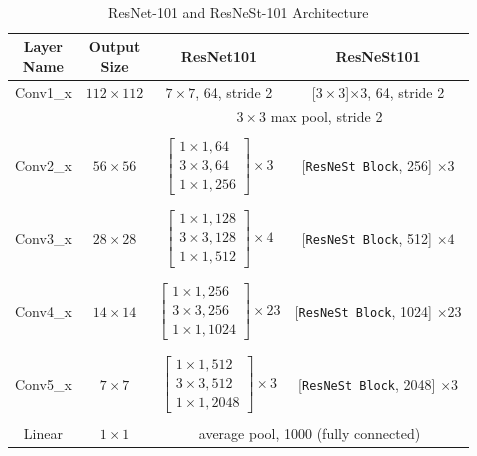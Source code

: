 \documentclass [MAS] {uclathes}
\begin{document}
\

\begin{table}[h!]
\centering
\footnotesize 
\renewcommand{\arraystretch}{0.7}
\begin{tabular}{ c | c | c | c } 
\hline
\makecell{\textbf{Layer} \\ \textbf{Name}} & \makecell{\textbf{Output} \\ \textbf{Size}} & \textbf{ResNet101} & \textbf{ResNeSt101}\\ 
\hline
\hline
Conv1\_x & $112 \times 112$ & $7 \times 7$, 64, stride 2 & [$3\times 3$]$\times 3$, 64, stride 2\\
\hline
 &  & \multicolumn{2}{c}{$3 \times 3$ max pool, stride 2}\\
\hline
&  & & \\
Conv2\_x & $56 \times 56$ & $\begin{bmatrix} 1 \times 1, 64  \\ 3 \times 3, 64 \\ 1 \times 1, 256 \end{bmatrix} \times 3$ & [\texttt{ResNeSt Block}, 256] $\times 3$\\
&  & & \\
\hline
&  & & \\
Conv3\_x & $28 \times 28$ & $\begin{bmatrix} 1 \times 1, 128  \\ 3 \times 3, 128 \\ 1 \times 1, 512 \end{bmatrix} \times 4$ & [\texttt{ResNeSt Block}, 512] $\times 4$\\
&  & & \\
\hline
&  & & \\
Conv4\_x & $14 \times 14$ & $\begin{bmatrix} 1 \times 1, 256  \\ 3 \times 3, 256 \\ 1 \times 1, 1024 \end{bmatrix} \times 23$ & [\texttt{ResNeSt Block}, 1024] $\times 23$\\
&  & & \\
\hline
&  & & \\
Conv5\_x & $7 \times 7$ & $\begin{bmatrix} 1 \times 1, 512  \\ 3 \times 3, 512 \\ 1 \times 1, 2048 \end{bmatrix} \times 3$ & [\texttt{ResNeSt Block}, 2048] $\times 3$\\
&  & & \\
\hline
Linear & $1 \times 1$ & \multicolumn{2}{c}{average pool, 1000 (fully connected)}\\
\hline  
\end{tabular}
\label{tab:resnet_resnest_archs}
\caption{ResNet-101 and ResNeSt-101 Architecture}
\end{table}
\end{document}
